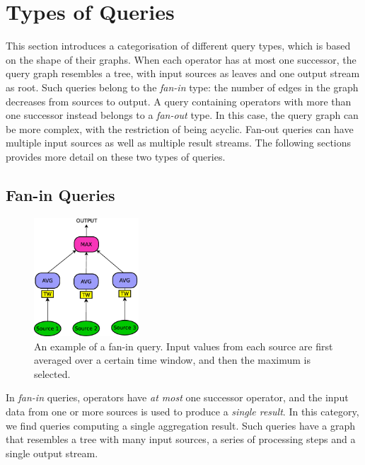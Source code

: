 \section{Types of Queries}
\label{sec:qtypes}



This section introduces a categorisation of different query types, which is
based on the shape of their graphs. When each operator has at most one successor, the query
graph resembles a tree, with input sources as leaves and one output stream as root. Such queries
belong to the \emph{fan-in} type: the number of edges in the graph decreases from sources
to output. 
A query containing operators with more than one successor instead belongs to a \emph{fan-out} type. 
In this case, the query graph can be more complex, with the restriction of being acyclic. Fan-out
queries can have multiple input sources as well as multiple result streams. 
The following sections provides more detail on these two types of queries.

\subsection*{Fan-in Queries}
\label{sec:fan-in}

\begin{figure}[b!]
	\centering
	\includegraphics[width=0.35\textwidth]{img/tesi/query_fanin_senza} 
	\caption{An example of a fan-in query. Input values from each source are first averaged over a certain
	time window, and then the maximum is selected.}
	\label{fig:query_fanin}
\end{figure}


In \emph{fan-in} queries, operators have \textit{at most} one successor operator, and the input data from
one or more sources is used to produce a \textit{single result}.
In this category, we find queries computing a single aggregation result.
Such queries have a graph that resembles a tree with many input sources, a series of
processing steps and a single output stream.


